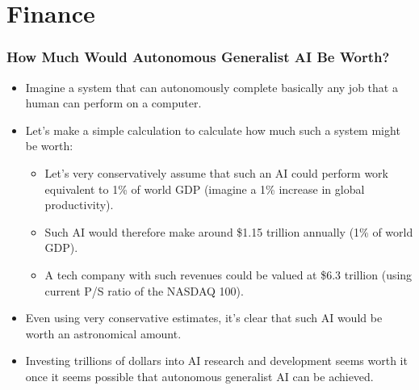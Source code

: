\documentclass[aspectratio=169]{beamer}
\begin{document}
    \section{Finance}
    \begin{frame}
        \frametitle{How Much Would Autonomous Generalist AI Be Worth?}
        \begin{itemize}
            \item Imagine a system that can autonomously complete basically any job that a human can perform on a computer.
            \item Let's make a simple calculation to calculate how much such a system might be worth:
            \begin{itemize}
                \item Let's very conservatively assume that such an AI could perform work equivalent to 1\% of world GDP (imagine a 1\% increase in global productivity).
                \item Such AI would therefore make around \$1.15 trillion annually (1\% of world GDP).
                \item A tech company with such revenues could be valued at \$6.3 trillion (using current P/S ratio of the NASDAQ 100).
            \end{itemize}
            \item Even using very conservative estimates, it's clear that such AI would be worth an astronomical amount.
            \item Investing trillions of dollars into AI research and development seems worth it once it seems possible that autonomous generalist AI can be achieved.
        \end{itemize}
    \end{frame}
\end{document}
